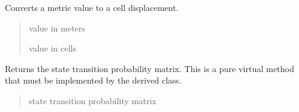 \documentclass[letterpaper,10pt,english]{sphinxmanual}
\begin{document}
\begin{fulllineitems}
\begin{fulllineitems}
\begin{quote}
\begin{description}
\end{description}\end{quote}

\end{fulllineitems}


\begin{fulllineitems}
\label{\detokenize{HF:HF.HF.ToCell}}
\pysigstartsignatures
{}
\pysigstopsignatures
\sphinxAtStartPar
Converts a metric value to a cell displacement.
\begin{quote}\begin{description}
\sphinxAtStartPar
{} \textendash{} value in meters

\sphinxAtStartPar
value in cells

\end{description}\end{quote}

\end{fulllineitems}


\begin{fulllineitems}
\label{\detokenize{HF:HF.HF.StateTransitionProbability}}
\pysigstartsignatures
{}
\pysigstopsignatures
\sphinxAtStartPar
Returns the state transition probability matrix.
This is a pure virtual method that must be implemented by the derived class.
\begin{quote}\begin{description}
\sphinxAtStartPar
{} state transition probability matrix

\end{description}\end{quote}

\end{fulllineitems}



\end{fulllineitems}
\end{document}
